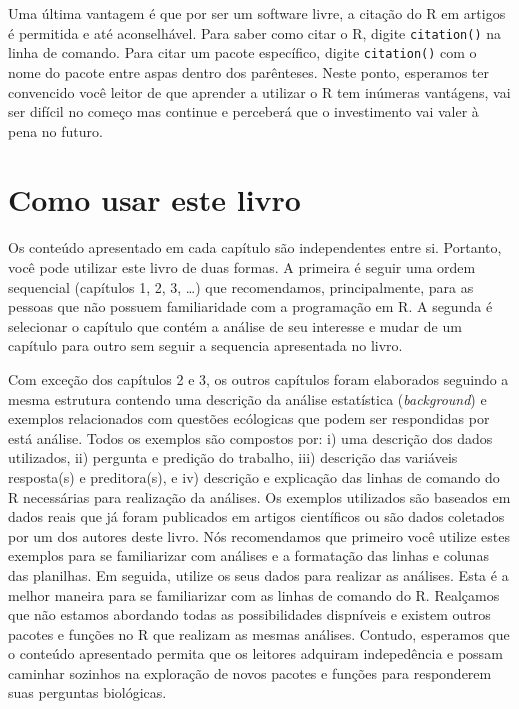 \documentclass[
]{book}
\begin{document}
Uma última vantagem é que por ser um software livre, a citação do R em artigos é permitida e até aconselhável. Para saber como citar o R, digite \texttt{citation()} na linha de comando. Para citar um pacote específico, digite \texttt{citation()} com o nome do pacote entre aspas dentro dos parênteses. Neste ponto, esperamos ter convencido você leitor de que aprender a utilizar o R tem inúmeras vantágens, vai ser difícil no começo mas continue e perceberá que o investimento vai valer à pena no futuro.

\hypertarget{como-usar-este-livro}{%
\section{Como usar este livro}\label{como-usar-este-livro}}

Os conteúdo apresentado em cada capítulo são independentes entre si. Portanto, você pode utilizar este livro de duas formas. A primeira é seguir uma ordem sequencial (capítulos 1, 2, 3, \ldots) que recomendamos, principalmente, para as pessoas que não possuem familiaridade com a programação em R. A segunda é selecionar o capítulo que contém a análise de seu interesse e mudar de um capítulo para outro sem seguir a sequencia apresentada no livro.

Com exceção dos capítulos 2 e 3, os outros capítulos foram elaborados seguindo a mesma estrutura contendo uma descrição da análise estatística (\emph{background}) e exemplos relacionados com questões ecólogicas que podem ser respondidas por está análise. Todos os exemplos são compostos por: i) uma descrição dos dados utilizados, ii) pergunta e predição do trabalho, iii) descrição das variáveis resposta(s) e preditora(s), e iv) descrição e explicação das linhas de comando do R necessárias para realização da análises. Os exemplos utilizados são baseados em dados reais que já foram publicados em artigos científicos ou são dados coletados por um dos autores deste livro. Nós recomendamos que primeiro você utilize estes exemplos para se familiarizar com análises e a formatação das linhas e colunas das planilhas. Em seguida, utilize os seus dados para realizar as análises. Esta é a melhor maneira para se familiarizar com as linhas de comando do R. Realçamos que não estamos abordando todas as possibilidades dispníveis e existem outros pacotes e funções no R que realizam as mesmas análises. Contudo, esperamos que o conteúdo apresentado permita que os leitores adquiram indepedência e possam caminhar sozinhos na exploração de novos pacotes e funções para responderem suas perguntas biológicas.
\end{document}
